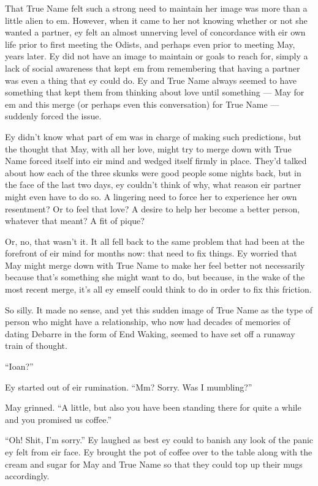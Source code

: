 That True Name felt such a strong need to maintain her image was more than a little alien to em. However, when it came to her not knowing whether or not she wanted a partner, ey felt an almost unnerving level of concordance with eir own life prior to first meeting the Odists, and perhaps even prior to meeting May, years later. Ey did not have an image to maintain or goals to reach for, simply a lack of social awareness that kept em from remembering that having a partner was even a thing that ey could do. Ey and True Name always seemed to have something that kept them from thinking about love until something — May for em and this merge (or perhaps even this conversation) for True Name — suddenly forced the issue.

Ey didn't know what part of em was in charge of making such predictions, but the thought that May, with all her love, might try to merge down with True Name forced itself into eir mind and wedged itself firmly in place. They'd talked about how each of the three skunks were good people some nights back, but in the face of the last two days, ey couldn't think of why, what reason eir partner might even have to do so. A lingering need to force her to experience her own resentment? Or to feel that love? A desire to help her become a better person, whatever that meant? A fit of pique?

Or, no, that wasn't it. It all fell back to the same problem that had been at the forefront of eir mind for months now: that need to fix things. Ey worried that May might merge down with True Name to make her feel better not necessarily because that's something she might want to do, but because, in the wake of the most recent merge, it's all ey emself could think to do in order to fix this friction.

So silly. It made no sense, and yet this sudden image of True Name as the type of person who might have a relationship, who now had decades of memories of dating Debarre in the form of End Waking, seemed to have set off a runaway train of thought.

``Ioan?''

Ey started out of eir rumination. ``Mm? Sorry. Was I mumbling?''

May grinned. ``A little, but also you have been standing there for quite a while and you promised us coffee.''

``Oh! Shit, I'm sorry.'' Ey laughed as best ey could to banish any look of the panic ey felt from eir face. Ey brought the pot of coffee over to the table along with the cream and sugar for May and True Name so that they could top up their mugs accordingly.

